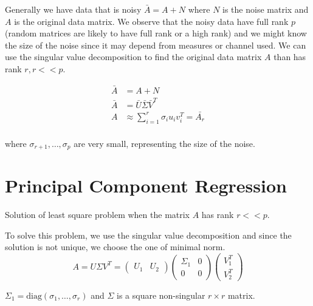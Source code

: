 \documentclass[a4paper, 12pt]{article}
\begin{document}
Generally we have data that is noisy $\bar{A} = A + N$ where $N$ is the noise matrix and $A$ is the original data matrix.
We observe that the noisy data have full rank $p$ (random matrices are likely to have full rank or a high rank)
and we might know the size of the noise since it may depend from measures or
channel used. We can use the singular value decomposition to find the original data matrix $A$ than has rank $r, r << p$.

\[
\begin{aligned}
\bar{A} &= A + N \\
\bar{A} &= \bar{U}\bar{\Sigma}\bar{V}^T \\
A &\approx \sum_{i=1}^r \sigma_i u_i v_i^T = \bar{A_r} \\
\end{aligned}
\]

where $\sigma_{r+1}, \ldots, \sigma_p$ are very small, representing the size of the noise.
\section*{Principal Component Regression}
Solution of least square problem when the matrix $A$ has rank $r << p$.

To solve this problem, we use the singular value decomposition and since the solution is not unique,
we choose the one of minimal norm.
\[
A = U \Sigma V^T =
\begin{pmatrix} U_1 & U_2 \end{pmatrix}
\begin{pmatrix}
\Sigma_1 & 0 \\
0 & 0 
\end{pmatrix} \begin{pmatrix}
V_1^T \\
V_2^T
\end{pmatrix}
\]

$\Sigma_1 = \text{diag}(\sigma_1, \ldots, \sigma_r)$ and $\Sigma$ is a square non-singular $r \times r$ matrix.
\end{document}
